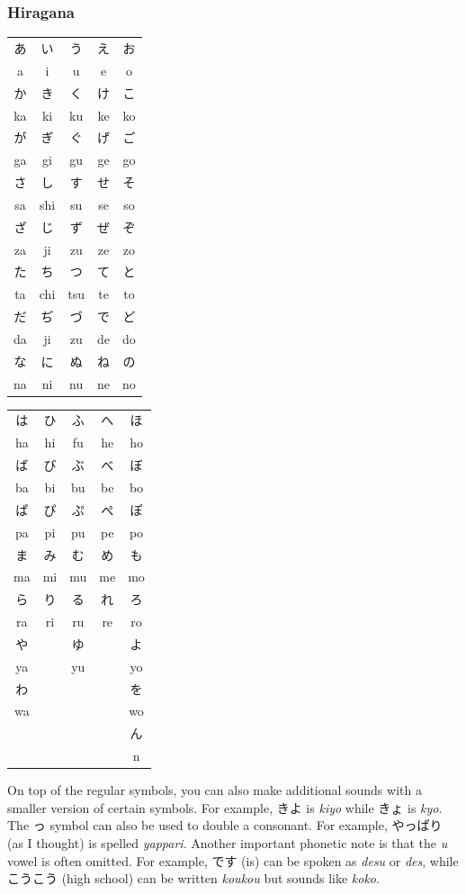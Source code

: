 \documentclass{article}
\begin{document}
\begin{CJK}{UTF8}{min}
\begin{multicols*}{3}
\subsubsection{Hiragana}
\begin{tabular}{|c|c|c|c|c|}
\hline
あ&い&う&え&お\\
a&i&u&e&o\\ \hline
か&き&く&け&こ\\
ka&ki&ku&ke&ko\\ \hline
が&ぎ&ぐ&げ&ご\\
ga&gi&gu&ge&go\\ \hline
さ&し&す&せ&そ\\
sa&shi&su&se&so\\ \hline
ざ&じ&ず&ぜ&ぞ\\
za&ji&zu&ze&zo\\ \hline
た&ち&つ&て&と\\
ta&chi&tsu&te&to\\ \hline
だ&ぢ&づ&で&ど\\
da&ji&zu&de&do\\ \hline
な&に&ぬ&ね&の\\
na&ni&nu&ne&no\\ \hline
\end{tabular}
\begin{tabular}{|c|c|c|c|c|}
\hline
は&ひ&ふ&へ&ほ\\
ha&hi&fu&he&ho\\ \hline
ば&び&ぶ&べ&ぼ\\
ba&bi&bu&be&bo\\ \hline
ぱ&ぴ&ぷ&ぺ&ぽ\\
pa&pi&pu&pe&po\\ \hline
ま&み&む&め&も\\
ma&mi&mu&me&mo\\ \hline
ら&り&る&れ&ろ\\
ra&ri&ru&re&ro\\ \hline
や&&ゆ&&よ\\
ya&&yu&&yo\\ \hline
わ&&&&を\\
wa&&&&wo\\ \hline
&&&&ん\\
&&&&n\\ \hline
\end{tabular}

On top of the regular symbols, you can also make additional sounds with a smaller version of certain symbols. For example, きよ is \textit{kiyo} while きょ is \textit{kyo}. The っ 
symbol can also be used to double a consonant. For example, やっぱり (as I thought) is spelled \textit{yappari}. Another important phonetic note is that the \textit{u} vowel is often 
omitted. For example, です (is) can be spoken as \textit{desu} or \textit{des}, while こうこう (high school) can be written \textit{koukou} but sounds like \textit{koko}.


\end{multicols*}
\end{CJK}
\end{document}
